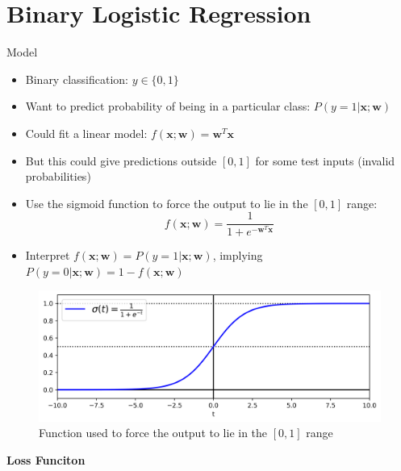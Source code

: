 \documentclass[a4paper, 11pt]{article}
\begin{document}
\section{Binary Logistic Regression}
\begin{center}
        \Large Model
\end{center}

\begin{itemize}
        \item Binary classification: $y\in\{0,1\}$
        \item Want to predict probability of being in a particular class: $P(y = 1|\mathbf{x};\mathbf{w})$
        \item Could fit a linear model: $f(\mathbf{x};\mathbf{w}) = \mathbf{w}^{T}\mathbf{x}$
        \item But this could give predictions outside $[0,1]$ for some test inputs (invalid probabilities)
        \item Use the sigmoid function to force the output to lie in the $[0,1]$ range:\[f(\mathbf{x};\mathbf{w}) = \frac{1}{1 + e^{-\mathbf{w}^{T}\mathbf{x}}}\]
        \item Interpret $f(\mathbf{x}; \mathbf{w}) = P(y = 1|\mathbf{x};\mathbf{w})$, implying $P(y = 0|\mathbf{x};\mathbf{w}) = 1 - f(\mathbf{x};\mathbf{w})$
\end{itemize}

\begin{figure}[H]
        \centering
        \includegraphics[scale=0.8]{sigmoid.png}
        \caption{Function used to force the output to lie in the $[0,1]$ range}
        \label{fig: Sigmoid Function}
\end{figure}
\newpage
{\Large \textbf{Loss Funciton}}
\end{document}
